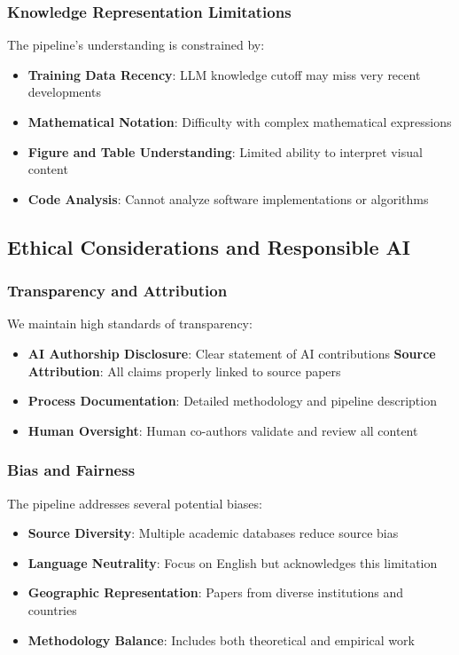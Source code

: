 \subsubsection{Knowledge Representation Limitations}

The pipeline's understanding is constrained by:

\begin{itemize}
    \item \textbf{Training Data Recency}: LLM knowledge cutoff may miss very recent developments
    \item \textbf{Mathematical Notation}: Difficulty with complex mathematical expressions
    \item \textbf{Figure and Table Understanding}: Limited ability to interpret visual content
    \item \textbf{Code Analysis}: Cannot analyze software implementations or algorithms
\end{itemize}

\subsection{Ethical Considerations and Responsible AI}

\subsubsection{Transparency and Attribution}

We maintain high standards of transparency:

\begin{itemize}
    \item \textbf{AI Authorship Disclosure}: Clear statement of AI contributions
    \textbf{Source Attribution}: All claims properly linked to source papers
    \item \textbf{Process Documentation}: Detailed methodology and pipeline description
    \item \textbf{Human Oversight}: Human co-authors validate and review all content
\end{itemize}

\subsubsection{Bias and Fairness}

The pipeline addresses several potential biases:

\begin{itemize}
    \item \textbf{Source Diversity}: Multiple academic databases reduce source bias
    \item \textbf{Language Neutrality}: Focus on English but acknowledges this limitation
    \item \textbf{Geographic Representation}: Papers from diverse institutions and countries
    \item \textbf{Methodology Balance}: Includes both theoretical and empirical work
\end{itemize}

